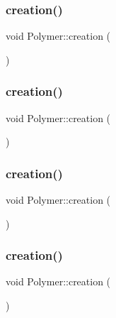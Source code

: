 \subsubsection{\texorpdfstring{creation()}{creation()}\hspace{0.1cm}{\footnotesize\ttfamily [6/10]}}
{\footnotesize\ttfamily void Polymer\+::creation (\begin{DoxyParamCaption}{ }\end{DoxyParamCaption})\hspace{0.3cm}{\ttfamily [inline]}}

\mbox{\label{classPolymer_a1daba3eb2ba8428bf2f3e814668b155f}} 
\subsubsection{\texorpdfstring{creation()}{creation()}\hspace{0.1cm}{\footnotesize\ttfamily [7/10]}}
{\footnotesize\ttfamily void Polymer\+::creation (\begin{DoxyParamCaption}{ }\end{DoxyParamCaption})\hspace{0.3cm}{\ttfamily [inline]}}

\mbox{\label{classPolymer_a1daba3eb2ba8428bf2f3e814668b155f}} 
\subsubsection{\texorpdfstring{creation()}{creation()}\hspace{0.1cm}{\footnotesize\ttfamily [8/10]}}
{\footnotesize\ttfamily void Polymer\+::creation (\begin{DoxyParamCaption}{ }\end{DoxyParamCaption})\hspace{0.3cm}{\ttfamily [inline]}}

\mbox{\label{classPolymer_a1daba3eb2ba8428bf2f3e814668b155f}} 
\subsubsection{\texorpdfstring{creation()}{creation()}\hspace{0.1cm}{\footnotesize\ttfamily [9/10]}}
{\footnotesize\ttfamily void Polymer\+::creation (\begin{DoxyParamCaption}{ }\end{DoxyParamCaption})\hspace{0.3cm}{\ttfamily [inline]}}

